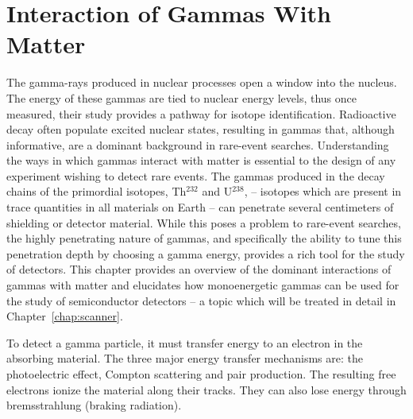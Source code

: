 \chapter{Interaction of Gammas With Matter}\label{chap:gammas}
The gamma-rays produced in nuclear processes open a window into the nucleus. The energy of these gammas are tied to nuclear energy levels, thus once measured, their study provides a pathway for isotope identification. Radioactive decay often populate excited nuclear states, resulting in gammas that, although informative, are a dominant background in rare-event searches. Understanding the ways in which gammas interact with matter is essential to the design of any experiment wishing to detect rare events. The gammas produced in the decay chains of the primordial isotopes, Th$^{232}$ and U$^{238}$, -- isotopes which are present in trace quantities in all materials on Earth -- can penetrate several centimeters of shielding or detector material. While this poses a problem to rare-event searches, the highly penetrating nature of gammas, and specifically the ability to tune this penetration depth by choosing a gamma energy, provides a rich tool for the study of detectors. This chapter provides an overview of the dominant interactions of gammas with matter and elucidates how monoenergetic gammas can be used for the study of semiconductor detectors -- a topic which will be treated in detail in Chapter~\ref{chap:scanner}.


To detect a gamma particle, it must transfer energy to an electron in the absorbing material. The three major energy transfer mechanisms are: the photoelectric effect, Compton scattering and pair production. The resulting free electrons ionize the material along their tracks. They can also lose energy through bremsstrahlung (braking radiation). 

